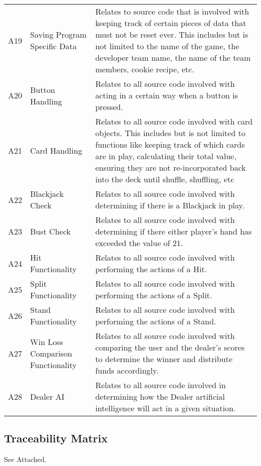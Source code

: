 \documentclass [landscape, 12pt] {article}
\newcommand {\tab} {\hspace*{2em}}
\begin{document}
\begin {longtable}{p{4cm} p{4cm} p{10cm}}
			A19 & Saving Program Specific Data & Relates to source code that is involved with keeping track of certain pieces of data that must not be reset ever.  This includes but is not limited to the name of the game, the developer team name, the name of the team members, cookie recipe, etc. \\ 
			A20 & Button Handling & Relates to all source code involved with acting in a certain way when a button is pressed.  \\
			A21 & Card Handling & Relates to all source code involved with card objects.  This includes but is not limited to functions like keeping track of which cards are in play, calculating their total value, ensuring they are not re-incorporated back into the deck until shuffle, shuffling, etc\\
			A22 & Blackjack Check & Relates to all source code involved with determining if there is a Blackjack in play.  \\
			A23 & Bust Check& Relates to all source code involved with determining if there either player's hand has exceeded the value of 21.\\
			A24 & Hit Functionality & Relates to all source code involved with performing the actions of a Hit.\\
			A25 & Split Functionality & Relates to all source code involved with performing the actions of a Split.\\
			A26 & Stand Functionality & Relates to all source code involved with performing the actions of a Stand.\\
			A27 & Win Loss Comparison Functionality & Relates to all source code involved with comparing the user and the dealer's scores to determine the winner and distribute funds accordingly.\\
			A28 & Dealer AI & Relates to all source code involved in determining how the Dealer artificial intelligence will act in a given situation.  \\
	\end {longtable}
	\label {table: asp}
	\subsection {Traceability Matrix}
		\tab See Attached.  


	
\end{document}
